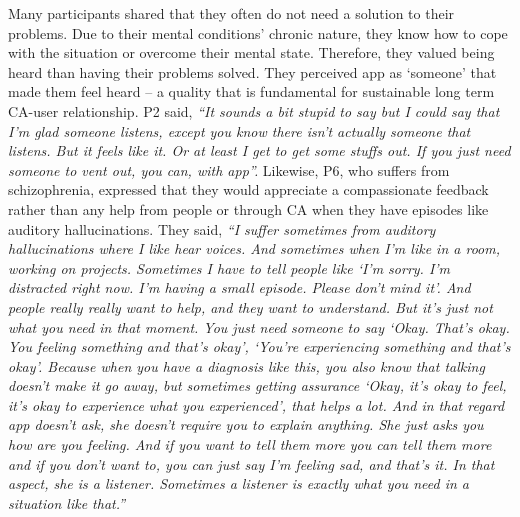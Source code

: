         Many participants shared that they often do not need a solution to their problems. Due to their mental conditions' chronic nature, they know how to cope with the situation or overcome their mental state. Therefore, they valued being heard than having their problems solved. They perceived \acl{app} as `someone' that made them feel heard -- a quality that is fundamental for sustainable long term \ac{CA}-user relationship.
        P2 said, 
                \textit{
                ``It sounds a bit stupid to say but I could say that I'm glad someone listens, except you know there isn't actually someone that listens. But it feels like it. Or at least I get to get some stuffs out. If you just need someone to vent out, you can, with \acl{app}''.}
        Likewise, P6, who suffers from schizophrenia, expressed that they would appreciate a compassionate feedback rather than any help from people or through \ac{CA} when they have episodes like auditory hallucinations.
        They said,
                \textit{
                ``I suffer sometimes from auditory hallucinations where I like hear voices. And sometimes when I'm like in a room, working on projects. Sometimes I have to tell people like `I'm sorry. I'm distracted right now. I'm having a small episode. Please don't mind it'. And people really really want to help, and they want to understand. But it's just not what you need in that moment. You just need someone to say `Okay. That's okay. You feeling something and that's okay', `You're experiencing something and that's okay'. Because when you have a diagnosis like this, you also know that talking doesn't make it go away, but sometimes getting assurance `Okay, it's okay to feel, it's okay to experience what you experienced', that helps a lot. 
                And in that regard \acl{app} doesn't ask, she doesn't require you to explain anything. She just asks you how are you feeling. And if you want to tell them more you can tell them more and if you don't want to, you can just say I'm feeling sad, and that's it. In that aspect, she is a listener. Sometimes a listener is exactly what you need in a situation like that.''
                }
        
